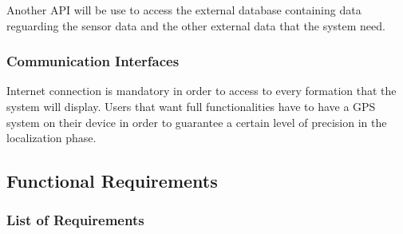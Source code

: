\documentclass[table, 12pt]{article}
\begin{document}
Another API will be use to access the external database containing data reguarding the sensor data and the other external data that the system need.

\subsubsection{Communication Interfaces}
Internet connection is mandatory in order to access to every formation that the system will display.
Users that want full functionalities have to have a GPS system on their device in order to guarantee a certain level of precision in the localization phase.

\subsection{Functional Requirements}

\subsubsection{List of Requirements}
\end{document}
